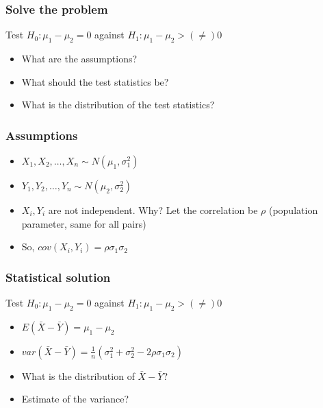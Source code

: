 \documentclass{beamer}\usepackage[]{graphicx}\usepackage[]{color}
\begin{document}
\begin{frame}

\frametitle{Solve the problem}

Test $H_0:\mu_1-\mu_2=0$ against $H_1:\mu_1-\mu_2 > (\ne) 0$ 

\begin{itemize}

\item What are the assumptions?

\item What should the test statistics be?

\item What is the distribution of the test statistics? 

\end{itemize}

\end{frame}

\begin{frame}

\frametitle{Assumptions}

\begin{itemize}
\item $X_1,X_2,\hdots,X_n \sim N(\mu_1,\sigma_1^2)$ 
\item $Y_1,Y_2,\hdots,Y_n\sim N(\mu_2,\sigma_2^2)$ 
\item $X_i,Y_i$ are not independent. Why? \pause Let the correlation be $\rho$ (population parameter, same for all pairs)
\item So, $cov(X_i,Y_i)=\rho\sigma_1\sigma_2$
\end{itemize}

\end{frame}


\begin{frame}

\frametitle{Statistical solution}

Test $H_0:\mu_1-\mu_2=0$ against $H_1:\mu_1-\mu_2 > (\ne) 0$ 

\vspace{0.3cm}

\begin{itemize}


\item $E(\bar X-\bar Y)=\mu_1-\mu_2$ 

\item $var(\bar X-\bar Y)=\frac1n(\sigma_1^2+\sigma_2^2-2\rho\sigma_1\sigma_2)$ 

\item What is the distribution of $\bar X-\bar Y$? 

\item Estimate of the variance?

\end{itemize}

\end{frame}
\end{document}

